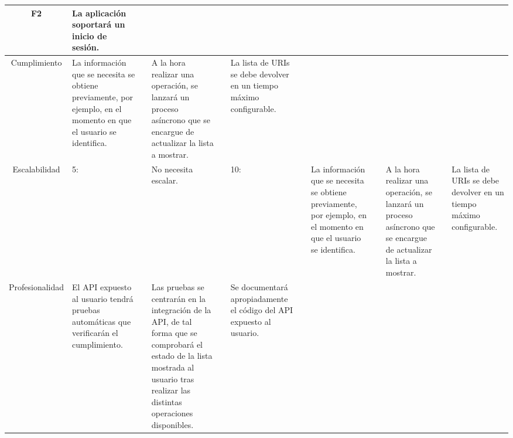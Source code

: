 \documentclass{article}
\begin{document}
\begin{table}[hbtp]
    \footnotesize
    \centering
    \settowidth{}
    \setlength\extrarowheight{5pt}
    \begin{tabulary}{\textwidth}{ C L }
        \textbf{F2} & La aplicación soportará un inicio de sesión.
        \\
    \hline
    
    Cumplimiento &
         \quad La información que se necesita se obtiene previamente, por ejemplo, en el momento en que el usuario se identifica. &&
         \quad A la hora realizar una operación, se lanzará un proceso asíncrono que se encargue de actualizar la lista a mostrar. &&
         \quad La lista de URIs se debe devolver en un tiempo máximo configurable. \\
        
    Escalabilidad &
    5: &&
        \quad {} \quad No necesita escalar. &&
         
    10: &&
        \quad {} \quad La información que se necesita se obtiene previamente, por ejemplo, en el momento en que el usuario se identifica. &&
		
        \quad {} \quad A la hora realizar una operación, se lanzará un proceso asíncrono que se encargue de actualizar la lista a mostrar. &&
 
        \quad {} \quad La lista de URIs se debe devolver en un tiempo máximo configurable. \\
 
    Profesionalidad & 
     \quad El API expuesto al usuario tendrá pruebas automáticas que verificarán el cumplimiento. &&
     \quad Las pruebas se centrarán en la integración de la API, de tal forma que se comprobará el estado de la lista mostrada al usuario tras realizar las distintas operaciones disponibles. &&
     \quad Se documentará apropiadamente el código del API expuesto al usuario.
    \end{tabulary}
\end{table}
 
\end{document}
